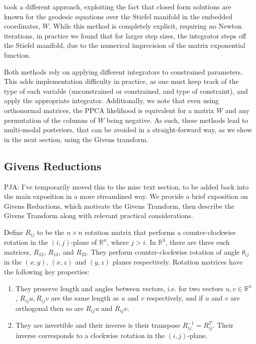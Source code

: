 \documentclass{article}
\newcommand{\commentPJA}[1]{{\textcolor{commentPJA_color}{PJA: #1}}}
\begin{document}
\citet{byrne2013geodesic} took a different approach, exploiting the fact that closed form solutions are known for the geodesic equations over the Stiefel manifold in the embedded coordinates, $W$. While this method is completely explicit, requiring no Newton iterations, in practice we found that for larger step sizes, the integrator steps off the Stiefel manifold, due to the numerical imprecision of the matrix exponential function.

Both methods rely on applying different integrators to constrained parameters. This adds implementation difficulty in practice, as one must keep track of the type of each variable (unconstrained or constrained, and type of constraint), and apply the appropriate integrator. Additionally, we note that even using orthonormal matrices, the PPCA likelihood is equivalent for a matrix $W$ and any permutation of the columns of $W$ being negative. As such, these methods lead to multi-modal posteriors, that can be avoided in a straight-forward way, as we show in the next section, using the Givens transform.

\subsection{Givens Reductions}

\commentPJA{I've temporarily moved this to the misc text section, to be added back into the main exposition in a more streamlined way.}
We provide a brief exposition on Givens Reductions, which motivate the Givens Transform, then describe the Givens Transform along with relevant practical considerations.

Define $R_{ij}$ to be the $n \times n$ rotation matrix that performs a counter-clockwise rotation in the $(i,j)$-plane of $\mathbb{R}^n$, where $j > i$. In $\mathbb{R}^3$, there are three such matrices, $R_{12}$, $R_{13}$, and $R_{23}$. They perform counter-clockwise rotation of angle $\theta_{ij}$ in the $(x,y)$, $(x,z)$ and $(y,z)$ planes respectively. Rotation matrices have the following key properties:

\begin{enumerate}
\item They preserve length and angles between vectors, i.e. for two vectors $u,v \in \mathbb{R}^n$, $R_{ij} u, R_{ij} v$ are the same length as $u$ and $v$ respectively, and if $u$ and $v$ are orthogonal then so are $R_{ij}u$ and $R_{ij}v$.
\item They are invertible and their inverse is their transpose $R_{ij}^{-1} = R_{ij}^T$. Their inverse corresponds to a clockwise rotation in the $(i,j)$-plane.
\end{enumerate}
\end{document}
